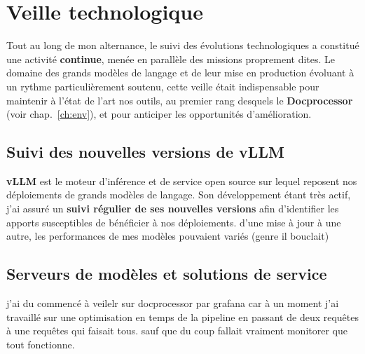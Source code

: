 \chapter{Veille technologique}\label{ch:veille}


Tout au long de mon alternance, le suivi des évolutions technologiques a constitué
une activité \textbf{continue}, menée en parallèle des missions proprement dites. Le
domaine des grands modèles de langage et de leur mise en production évoluant à un
rythme particulièrement soutenu, cette veille était indispensable pour maintenir à
l'état de l'art nos outils, au premier rang desquels le \textbf{Docprocessor} (voir
chap.~\ref{ch:env}), et pour anticiper les opportunités d'amélioration.

\section{Suivi des nouvelles versions de vLLM}

\textbf{vLLM} est le moteur d'inférence et de service open source sur lequel
reposent nos déploiements de grands modèles de langage. Son développement étant très
actif, j'ai assuré un \textbf{suivi régulier de ses nouvelles versions} afin
d'identifier les apports susceptibles de bénéficier à nos déploiements.
d'une mise à jour à une autre, les performances de mes modèles pouvaient variés (genre il bouclait)

\section{Serveurs de modèles et solutions de service}

j'ai du commencé à veilelr sur docprocessor par grafana car à un moment j'ai travaillé sur une optimisation en temps de la pipeline en passant de deux requêtes à une requêtes qui faisait tous.
sauf que du coup fallait vraiment monitorer que tout fonctionne.



